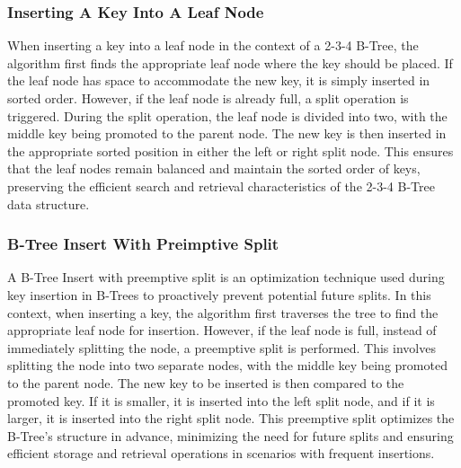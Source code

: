\subsubsection{Inserting A Key Into A Leaf Node}

When inserting a key into a leaf node in the context of a 2-3-4 B-Tree, the algorithm first finds the appropriate leaf node where the key should be placed. If the leaf node has space to accommodate the new key, it is simply inserted in sorted order. However, if the leaf node is already full, a split operation is triggered. During the split operation, 
the leaf node is divided into two, with the middle key being promoted to the parent node. The new key is then inserted in the appropriate sorted position in either the left or right split node. This ensures that the leaf nodes remain balanced and maintain the sorted order of keys, preserving the efficient search and retrieval characteristics of the 
2-3-4 B-Tree data structure.

\subsubsection{B-Tree Insert With Preimptive Split}

A B-Tree Insert with preemptive split is an optimization technique used during key insertion in B-Trees to proactively prevent potential future splits. In this context, when inserting a key, the algorithm first traverses the tree to find the appropriate leaf node for insertion. However, if the leaf node is full, instead of immediately splitting the node, 
a preemptive split is performed. This involves splitting the node into two separate nodes, with the middle key being promoted to the parent node. The new key to be inserted is then compared to the promoted key. If it is smaller, it is inserted into the left split node, and if it is larger, it is inserted into the right split node. This preemptive split optimizes 
the B-Tree's structure in advance, minimizing the need for future splits and ensuring efficient storage and retrieval operations in scenarios with frequent insertions.

